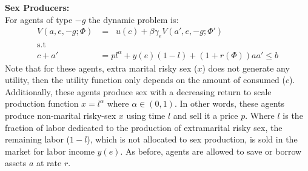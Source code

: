 \noindent \textbf{Sex Producers:}\\
For agents of type $-g$ the dynamic problem is:
\begin{align}
V(a,e,-g;\Phi) &= \mathop{\max_{c\geq 0, 1\geq l\geq 0,a' \geq 0}}  u(c) + \beta \gamma_{e} V(a',e,-g;\Phi') \label{eq3}\\
\mbox{s.t}\nonumber\\
c +a'&= pl^{\alpha}+y(e)(1-l) + (1+r(\Phi))a \label{eq4}
a' \leq b
\end{align}
Note that for these agents, extra marital risky sex ($x$) does not generate any utility, then the utility function only depends on the amount of consumed ($c$). Additionally, these agents produce sex with a decreasing return to scale production function $x=l^{\alpha}$ where $\alpha\in(0,1)$. In other words, these agents produce non-marital risky-sex $x$ using time $l$ and sell it a price $p$. Where $l$ is the fraction of labor dedicated to the production of extramarital risky sex, the remaining labor ($1-l$), which is not allocated to sex production, is sold in the market for labor income $y(e)$. As before, agents are allowed to save or borrow assets $a$ at rate $r$.\\
\begin{comment}
\noindent The above problem can be written in sequential form: 
\begin{align*}
\mathop{\max_{c_{t},l_{t},a_{t+1}}}&E_{0}\sum^{\infty}_{t=0}\beta^{t}u(c_{t})  \\
\mbox{s.t}\\ 
c_{t}+a_{t+1}&=p_{t}l_{t}^{\alpha}+y(e)(1-l_{t})+(1+r_{t})a_{t}
\end{align*}
 \textbf{FOC's:}\\
 \begin{align*}
 \frac{\partial u(c_{t})}{\partial l_{t}}&=-u'_{c}(c_{t})(\alpha p_{t} u^{\alpha-1}-y(e))=0\\
 \frac{\partial u(c_{t})}{\partial a_{t+1}}&=-u'_{c}(c_{t})+u'_{c}(c_{t+1})(1+r_{t})\beta=0
 \end{align*}
 Given the sequence of prices $\{p_{t}\}_{t=0}^{\infty},\{r_{t}\}_{t=0}^{\infty}$ the solution are the sequences of allocations $\{c_{t}\}_{t=0}^{\infty},\{l_{t}\}_{t=0}^{\infty}, \{l_{t}\}_{t=0}^{\infty}, \{a_{t}\}_{t=0}^{\infty}$ that solve  the agent's problem.\\
 
\end{comment}



